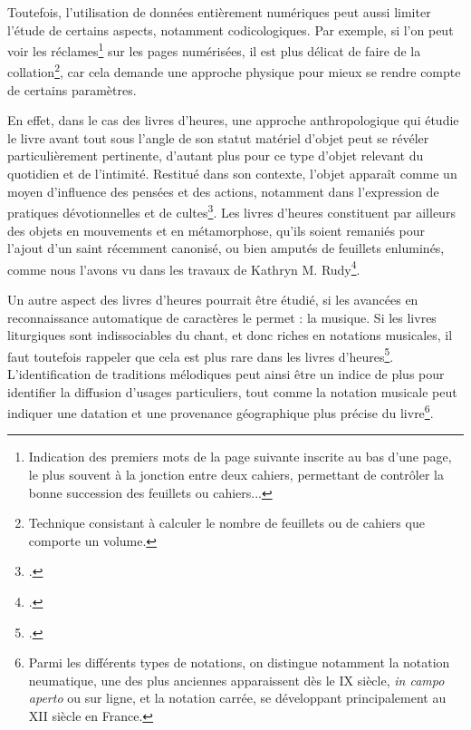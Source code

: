 \documentclass[a4paper,12pt,twoside]{book}
\begin{document}
	Toutefois, l'utilisation de données entièrement numériques peut aussi limiter l'étude de certains aspects, notamment codicologiques. Par exemple, si l'on peut voir les réclames\footnote{\og Indication des premiers mots de la page suivante inscrite au bas d'une page, le plus souvent à la jonction entre deux cahiers, permettant de contrôler la bonne succession des feuillets ou cahiers.\fg{}.\cite{dico_codicologie}.} sur les pages numérisées, il est plus délicat de faire de la collation\footnote{Technique consistant à calculer le nombre de feuillets ou de cahiers que comporte un volume.}, car cela demande une approche physique pour mieux se rendre compte de certains paramètres. 
	
	En effet, dans le cas des livres d'heures, une approche anthropologique qui étudie le livre avant tout sous l'angle de son statut matériel d'objet peut se révéler particulièrement pertinente, d'autant plus pour ce type d'objet relevant du quotidien et de l'intimité. Restitué dans son contexte, l'objet apparaît comme un moyen d'influence des pensées et des actions, notamment dans l'expression de pratiques dévotionnelles et de cultes\footcite[p. 262]{Art_Agency}. Les livres d'heures constituent par ailleurs des objets en mouvements et en métamorphose, qu'ils soient remaniés pour l'ajout d'un saint récemment canonisé, ou bien amputés de feuillets enluminés, comme nous l'avons vu dans les travaux de Kathryn M. Rudy\footcite{Piety_in_Pieces}.
	
	Un autre aspect des livres d'heures pourrait être étudié, si les avancées en reconnaissance automatique de caractères le permet : la musique. Si les livres liturgiques sont indissociables du chant, et donc riches en notations musicales, il faut toutefois rappeler que cela est plus rare dans les livres d'heures\footcite[p. 57]{Music_Livre_Heures}. L'identification de traditions mélodiques peut ainsi être un indice de plus pour identifier la diffusion d'usages particuliers, tout comme la notation musicale peut indiquer une datation et une provenance géographique plus précise du livre\footnote{Parmi les différents types de notations, on distingue notamment la notation neumatique, une des plus anciennes apparaissent dès le \textsc{IX} siècle, \textit{in campo aperto} ou sur ligne, et la notation carrée, se développant principalement au \textsc{XII} siècle en France.}. \\
	
\end{document}
